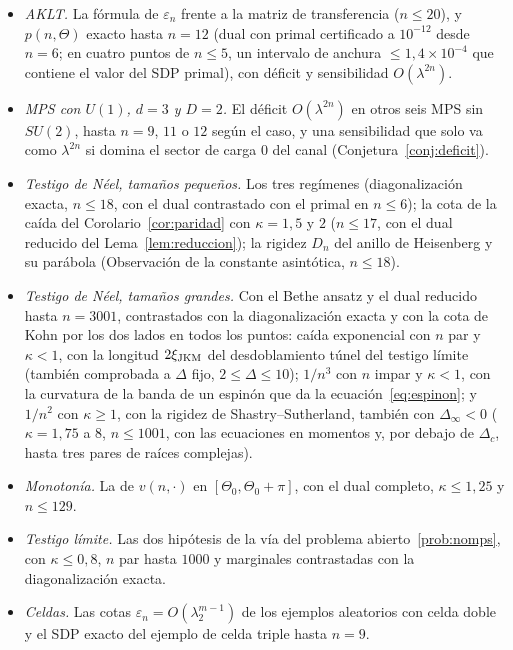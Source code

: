 \documentclass[11pt,a4paper]{article}
\theoremstyle{remark}
\begin{document}
\begin{itemize}
\item \emph{AKLT.} La fórmula de $\varepsilon_n$ frente a la matriz de transferencia ($n\le20$), y
  $p(n,\Theta)$ exacto hasta $n=12$ (dual con primal certificado a $10^{-12}$ desde $n=6$; en cuatro
  puntos de $n\le5$, un intervalo de anchura $\le1{,}4\times10^{-4}$ que contiene el valor del SDP
  primal), con déficit y sensibilidad $O(\lambda^{2n})$.
\item \emph{MPS con $U(1)$, $d=3$ y $D=2$.} El déficit $O(\lambda^{2n})$ en otros seis MPS sin
  $SU(2)$, hasta $n=9$, $11$ o $12$ según el caso, y una sensibilidad que solo va como
  $\lambda^{2n}$ si domina el sector de carga $0$ del canal (Conjetura~\ref{conj:deficit}).
\item \emph{Testigo de Néel, tamaños pequeños.} Los tres regímenes (diagonalización exacta,
  $n\le18$, con el dual contrastado con el primal en $n\le6$); la cota de la caída del
  Corolario~\ref{cor:paridad} con $\kappa=1{,}5$ y $2$ ($n\le17$, con el dual reducido del
  Lema~\ref{lem:reduccion}); la rigidez $D_n$ del anillo de Heisenberg y su parábola (Observación
  de la constante asintótica, $n\le18$).
\item \emph{Testigo de Néel, tamaños grandes.} Con el Bethe ansatz y el dual reducido hasta
  $n=3001$, contrastados con la diagonalización exacta y con la cota de Kohn por los dos lados en
  todos los puntos: caída exponencial con $n$ par y $\kappa<1$, con la longitud $2\xi_{\rm JKM}$ del
  desdoblamiento túnel del testigo límite (también comprobada a $\Delta$ fijo, $2\le\Delta\le10$);
  $1/n^3$ con $n$ impar y $\kappa<1$, con la curvatura de la banda de un espinón que da la
  ecuación~\eqref{eq:espinon}; y $1/n^2$ con $\kappa\ge1$, con la rigidez de Shastry--Sutherland,
  también con $\Delta_\infty<0$ ($\kappa=1{,}75$ a $8$, $n\le1001$, con las ecuaciones en
  momentos y, por debajo de $\Delta_c$, hasta tres pares de raíces complejas).
\item \emph{Monotonía.} La de $v(n,\cdot)$ en $[\Theta_0,\Theta_0+\pi]$, con el dual completo,
  $\kappa\le1{,}25$ y $n\le129$.
\item \emph{Testigo límite.} Las dos hipótesis de la vía del problema abierto~\ref{prob:nomps},
  con $\kappa\le0{,}8$, $n$ par hasta $1000$ y marginales contrastadas con la diagonalización
  exacta.
\item \emph{Celdas.} Las cotas $\varepsilon_n=O(\lambda_2^{m-1})$ de los ejemplos aleatorios con
  celda doble y el SDP exacto del ejemplo de celda triple hasta $n=9$.
\end{itemize}
\end{document}
